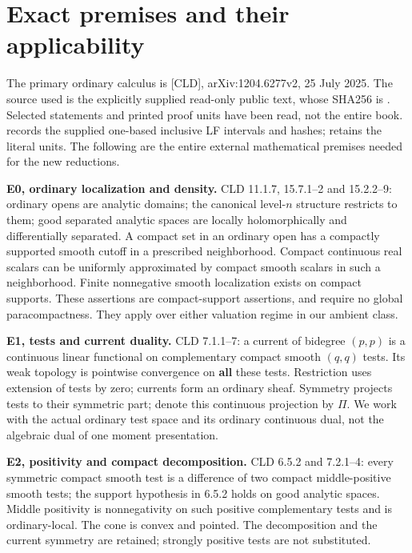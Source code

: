 \documentclass[
  11pt,
]{article}
\begin{document}
\section{Exact premises and their
applicability}\label{exact-premises-and-their-applicability}

The primary ordinary calculus is {[}CLD{]}, arXiv:1204.6277v2, 25 July
2025. The source used is the explicitly supplied read-only public text,
whose SHA256 is
.
Selected statements and printed proof units have been read, not the
entire book.  records the supplied one-based
inclusive LF intervals and hashes; 
retains the literal units. The following are the entire external
mathematical premises needed for the new reductions.

\textbf{E0, ordinary localization and density.} CLD 11.1.7, 15.7.1--2
and 15.2.2--9: ordinary opens are analytic domains; the canonical
level-\(n\) structure restricts to them; good separated analytic spaces
are locally holomorphically and differentially separated. A compact set
in an ordinary open has a compactly supported smooth cutoff in a
prescribed neighborhood. Compact continuous real scalars can be
uniformly approximated by compact smooth scalars in such a neighborhood.
Finite nonnegative smooth localization exists on compact supports. These
assertions are compact-support assertions, and require no global
paracompactness. They apply over either valuation regime in our ambient
class.

\textbf{E1, tests and current duality.} CLD 7.1.1--7: a current of
bidegree \((p,p)\) is a continuous linear functional on complementary
compact smooth \((q,q)\) tests. Its weak topology is pointwise
convergence on \textbf{all} these tests. Restriction uses extension of
tests by zero; currents form an ordinary sheaf. Symmetry projects tests
to their symmetric part; denote this continuous projection by \(\Pi\).
We work with the actual ordinary test space and its ordinary continuous
dual, not the algebraic dual of one moment presentation.

\textbf{E2, positivity and compact decomposition.} CLD 6.5.2 and
7.2.1--4: every symmetric compact smooth test is a difference of two
compact middle-positive smooth tests; the support hypothesis in 6.5.2
holds on good analytic spaces. Middle positivity is nonnegativity on
such positive complementary tests and is ordinary-local. The cone is
convex and pointed. The decomposition and the current symmetry are
retained; strongly positive tests are not substituted.
\end{document}
